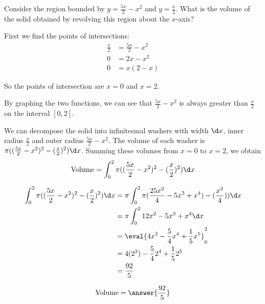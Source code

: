 \documentclass{ximera}
\author{Steven Gubkin}
\begin{document}
\begin{exercise}



Consider the region bounded by $y = \frac{5x}{2}-x^2$ and
$y=\frac{x}{2}$.  What is the volume of the solid obtained by
revolving this region about the $x$-axis?

\begin{hint}
  First we find the points of intersections:
  \begin{align*}
    \frac{x}{2} &= \frac{5x}{2}-x^2\\
	0 &= 2x-x^2\\
	0&= x(2-x)
	\end{align*}

  So the points of intersection are $x=0$ and $x=2$.
\end{hint}

\begin{hint}
  By graphing the two functions, we can see that $\frac{5x}{2}-x^2$ is
  always greater than $\frac{x}{2}$ on the interval $[0,2]$.
\end{hint}

\begin{hint}
  We can decompose the solid into infinitesmal washers with width
  $\d x$, inner radius $\frac{x}{2}$ and outer radius
  $\frac{5x}{2}-x^2$.  The volume of each washer is
  $\pi((\frac{5x}{2}-x^2)^2-(\frac{x}{2})^2)\d x$.  Summing these
  volumes from $x=0$ to $x=2$, we obtain
  \[
  \textrm{Volume} = \int_0^2 \pi((\frac{5x}{2}-x^2)^2-(\frac{x}{2})^2) \d x
  \]
\end{hint}

\begin{hint}
  \begin{align*}
    \int_0^2 \pi((\frac{5x}{2}-x^2)^2-(\frac{x}{2})^2) \d x&= \pi \int_0^2 \pi(\frac{25x^2}{4}-5x^3+x^4)-(\frac{x^2}{4})) \d x\\
    &=\pi \int_0^2 12x^2-5x^3+x^4 \d x\\
    &= \eval{4x^3-\frac{5}{4}x^4+\frac{1}{5}x^5}_0^2\\
    &=4(2^3)-\frac{5}{4}2^4+\frac{1}{5}2^5\\
    &=\frac{92}{5}
  \end{align*}
\end{hint}

\begin{prompt}
  \[
	\textrm{Volume} = \answer{\frac{92}{5}}
	\]
\end{prompt}

\end{exercise}
\end{document}
